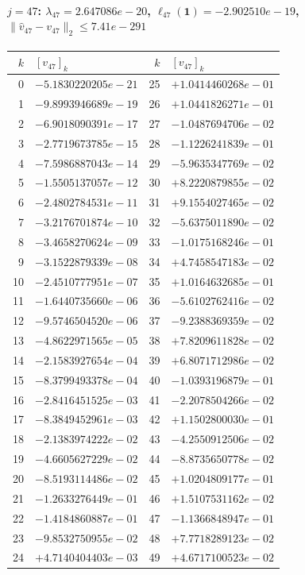 \paragraph{$j = 47$: $\lambda_{47} = 2.647086e-20$, \quad $\ell_{47}(\mathbf{1}) = -2.902510e-19$, \quad $\|\hat{v}_{47} - v_{47}\|_2 \leq 7.41e-291$}
\begin{center}
{\footnotesize
\begin{tabular}{r@{\;\;}l@{\quad}r@{\;\;}l}
\toprule
$k$ & $[v_{47}]_k$ & $k$ & $[v_{47}]_k$ \\
\midrule
0 & $-5.1830220205e-21$ & 25 & $+1.0414460268e-01$ \\
1 & $-9.8993946689e-19$ & 26 & $+1.0441826271e-01$ \\
2 & $-6.9018090391e-17$ & 27 & $-1.0487694706e-02$ \\
3 & $-2.7719673785e-15$ & 28 & $-1.1226241839e-01$ \\
4 & $-7.5986887043e-14$ & 29 & $-5.9635347769e-02$ \\
5 & $-1.5505137057e-12$ & 30 & $+8.2220879855e-02$ \\
6 & $-2.4802784531e-11$ & 31 & $+9.1554027465e-02$ \\
7 & $-3.2176701874e-10$ & 32 & $-5.6375011890e-02$ \\
8 & $-3.4658270624e-09$ & 33 & $-1.0175168246e-01$ \\
9 & $-3.1522879339e-08$ & 34 & $+4.7458547183e-02$ \\
10 & $-2.4510777951e-07$ & 35 & $+1.0164632685e-01$ \\
11 & $-1.6440735660e-06$ & 36 & $-5.6102762416e-02$ \\
12 & $-9.5746504520e-06$ & 37 & $-9.2388369359e-02$ \\
13 & $-4.8622971565e-05$ & 38 & $+7.8209611828e-02$ \\
14 & $-2.1583927654e-04$ & 39 & $+6.8071712986e-02$ \\
15 & $-8.3799493378e-04$ & 40 & $-1.0393196879e-01$ \\
16 & $-2.8416451525e-03$ & 41 & $-2.2078504266e-02$ \\
17 & $-8.3849452961e-03$ & 42 & $+1.1502800030e-01$ \\
18 & $-2.1383974222e-02$ & 43 & $-4.2550912506e-02$ \\
19 & $-4.6605627229e-02$ & 44 & $-8.8735650778e-02$ \\
20 & $-8.5193114486e-02$ & 45 & $+1.0204809177e-01$ \\
21 & $-1.2633276449e-01$ & 46 & $+1.5107531162e-02$ \\
22 & $-1.4184860887e-01$ & 47 & $-1.1366848947e-01$ \\
23 & $-9.8532750955e-02$ & 48 & $+7.7718289123e-02$ \\
24 & $+4.7140404403e-03$ & 49 & $+4.6717100523e-02$ \\
\bottomrule
\end{tabular}
}
\end{center}

